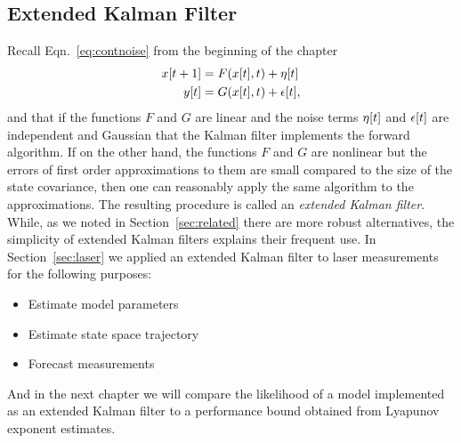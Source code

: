 \subsection{Extended Kalman Filter}
\label{sec:EKF}

Recall Eqn.~\eqref{eq:contnoise} from the beginning of the chapter
\begin{align*}
  {x}{[t+1]} &= F({x}{[t]},t) + {\eta}{[t]}\\
  {y}{[t]}   &= G({x}{[t]},t) + {\epsilon}{[t]},
\end{align*}
and that if the functions $F$ and $G$ are linear and the noise terms
${\eta}{[t]}$ and ${\epsilon}{[t]}$ are independent and Gaussian
that the Kalman filter implements the forward algorithm.  If on the
other hand, the functions $F$ and $G$ are nonlinear but the errors of
first order approximations to them are small compared to the size of
the state covariance, then one can reasonably apply the same algorithm to the
approximations.  The resulting procedure is called an \emph{extended
  Kalman filter}.  While, as we noted in Section~\ref{sec:related}
there are more robust alternatives, the simplicity of extended Kalman
filters explains their frequent use.  In Section~\ref{sec:laser} we
applied an extended Kalman filter to laser measurements for the
following purposes:
\begin{itemize}
\item Estimate model parameters
\item Estimate state space trajectory
\item Forecast measurements
\end{itemize}
And in the next chapter we will compare the likelihood of a model
implemented as an extended Kalman filter to a performance bound
obtained from Lyapunov exponent estimates.

